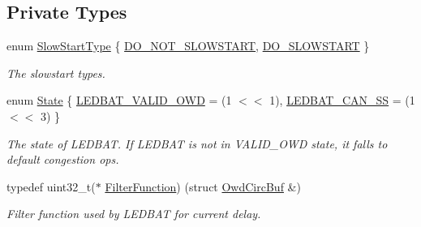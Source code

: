 \subsection*{Private Types}
\begin{DoxyCompactItemize}
\item 
enum \hyperlink{classns3_1_1TcpLedbat_a7099bb59b406b311fab27960df7c8620}{Slow\+Start\+Type} \{ \hyperlink{classns3_1_1TcpLedbat_a7099bb59b406b311fab27960df7c8620ac4ed97ba794665876b847c01dd9c84e9}{D\+O\+\_\+\+N\+O\+T\+\_\+\+S\+L\+O\+W\+S\+T\+A\+RT}, 
\hyperlink{classns3_1_1TcpLedbat_a7099bb59b406b311fab27960df7c8620aff8b53c555fefc60284c7bd4301c002f}{D\+O\+\_\+\+S\+L\+O\+W\+S\+T\+A\+RT}
 \}\begin{DoxyCompactList}\small\item\em The slowstart types. \end{DoxyCompactList}
\item 
enum \hyperlink{classns3_1_1TcpLedbat_a03558d477638e07ba730413988f12d44}{State} \{ \hyperlink{classns3_1_1TcpLedbat_a03558d477638e07ba730413988f12d44a5465ff5c06920abd88c4c63e0e566039}{L\+E\+D\+B\+A\+T\+\_\+\+V\+A\+L\+I\+D\+\_\+\+O\+WD} = (1 $<$$<$ 1), 
\hyperlink{classns3_1_1TcpLedbat_a03558d477638e07ba730413988f12d44a3d2d6232f71c96ec1bd4b0fb41080bd5}{L\+E\+D\+B\+A\+T\+\_\+\+C\+A\+N\+\_\+\+SS} = (1 $<$$<$ 3)
 \}\begin{DoxyCompactList}\small\item\em The state of L\+E\+D\+B\+AT. If L\+E\+D\+B\+AT is not in V\+A\+L\+I\+D\+\_\+\+O\+WD state, it falls to default congestion ops. \end{DoxyCompactList}
\item 
typedef uint32\+\_\+t($\ast$ \hyperlink{classns3_1_1TcpLedbat_a44a96f49fc459cec6e691e2d04f56a03}{Filter\+Function}) (struct \hyperlink{structns3_1_1TcpLedbat_1_1OwdCircBuf}{Owd\+Circ\+Buf} \&)
\begin{DoxyCompactList}\small\item\em Filter function used by L\+E\+D\+B\+AT for current delay. \end{DoxyCompactList}\end{DoxyCompactItemize}
